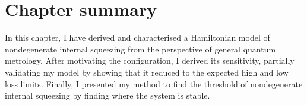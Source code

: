 


\section{Chapter summary}

In this chapter, I have derived and characterised a Hamiltonian model of nondegenerate internal squeezing from the perspective of general quantum metrology.
After motivating the configuration, I derived its sensitivity, partially validating my model by showing that it reduced to the expected high and low loss limits. Finally, I presented my method to find the threshold of nondegenerate internal squeezing by finding where the system is stable. %



